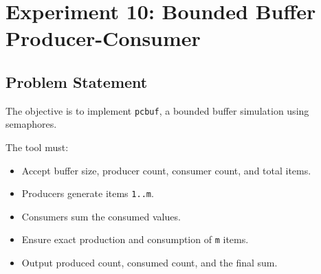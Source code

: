 
\section{Experiment 10: Bounded Buffer Producer-Consumer}

\subsection{Problem Statement}
The objective is to implement \texttt{pcbuf}, a bounded buffer simulation using semaphores.

The tool must:
\begin{itemize}
    \item Accept buffer size, producer count, consumer count, and total items.
    \item Producers generate items \verb|1..m|.
    \item Consumers sum the consumed values.
    \item Ensure exact production and consumption of \verb|m| items.
    \item Output produced count, consumed count, and the final sum.
\end{itemize}


